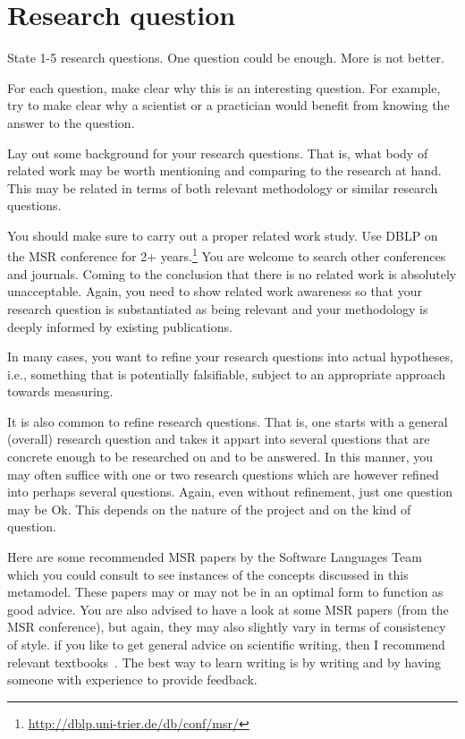 \documentclass{llncs}
\begin{document}

\section{Research question}

State 1-5 research questions. One question could be enough. More is
not better.

For each question, make clear why this is an interesting question. For
example, try to make clear why a scientist or a practician would
benefit from knowing the answer to the question.

Lay out some background for your research questions. That is, what
body of related work may be worth mentioning and comparing to the
research at hand. This may be related in terms of both relevant
methodology or similar research questions.

You should make sure to carry out a proper related work study. Use
DBLP on the MSR conference for 2+
years.\footnote{\url{http://dblp.uni-trier.de/db/conf/msr/}} You are
welcome to search other conferences and journals. Coming to the
conclusion that there is no related work is absolutely
unacceptable. Again, you need to show related work awareness so that
your research question is substantiated as being relevant and
your methodology is deeply informed by existing publications.

In many cases, you want to refine your research questions into actual
hypotheses, i.e., something that is potentially falsifiable, subject
to an appropriate approach towards measuring.

It is also common to refine research questions. That is, one starts
with a general (overall) research question and takes it appart into
several questions that are concrete enough to be researched on and to
be answered. In this manner, you may often suffice with one or two
research questions which are however refined into perhaps
several questions. Again, even without refinement, just one question may be
Ok. This depends on the nature of the project and on the kind of question.

Here are some recommended MSR papers by the Software Languages
Team~\cite{LaemmelLPV11,LaemmelP13,SchmorleizL15} which you could
consult to see instances of the concepts discussed in this
metamodel. These papers may or may not be in an optimal form to
function as good advice. You are also advised to have a look at some
MSR papers (from the MSR conference), but again, they may also
slightly vary in terms of consistency of style. if you like to get
general advice on scientific writing, then I recommend relevant
textbooks~\cite{Day98,Zobel09}. The best way to learn writing is by
writing and by having someone with experience to provide feedback.
\end{document}
